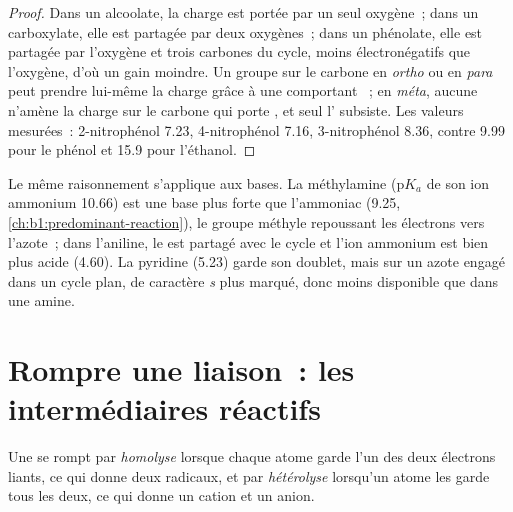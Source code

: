 \begin{proof}
Dans un alcoolate, la charge est portée par un seul oxygène~; dans un
carboxylate, elle est partagée par deux oxygènes~; dans un phénolate,
elle est partagée par l'oxygène et trois carbones du cycle, moins
électronégatifs que l'oxygène, d'où un gain moindre. Un groupe
 sur le carbone en \textit{ortho} ou en \textit{para} peut
prendre lui-même la charge grâce à une  comportant
~; en
\textit{méta}, aucune  n'amène la charge sur le carbone
qui porte , et seul l' subsiste. Les valeurs
mesurées~: 2-nitrophénol 7.23, 4-nitrophénol 7.16, 3-nitrophénol 8.36,
contre 9.99 pour le phénol et 15.9 pour l'éthanol.
\end{proof}

Le même raisonnement s'applique aux bases. La méthylamine
($\mathrm{p}K_a$ de son ion ammonium 10.66) est une base plus forte que
l'ammoniac (9.25, \cref{ch:b1:predominant-reaction}),
le groupe méthyle repoussant les électrons vers l'azote~; dans
l'aniline, le  est partagé avec le cycle et l'ion
ammonium est bien plus acide (4.60). La pyridine (5.23) garde son
doublet, mais sur un azote engagé dans un cycle plan, de caractère
\textit{s} plus marqué, donc moins disponible que dans une amine.

\section{Rompre une liaison~: les intermédiaires réactifs}

\begin{definition}\label{def:b1:electronic-effects:cleavage}
Une  se rompt par \emph{homolyse}
lorsque chaque atome garde l'un des deux électrons liants, ce qui donne
deux radicaux, et par \emph{hétérolyse} lorsqu'un atome les garde
tous les deux, ce qui donne un cation et un anion.
\end{definition}

